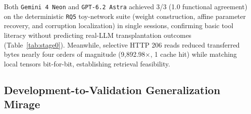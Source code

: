 \documentclass[11pt]{article}
\begin{document}
\begin{table}[htbp]
\centering
\caption{Calibration baselines, exploratory \texttt{RQ5} synthetic toy-network comparison (with disclosed aggregate-score visibility caveat before Astra's session), and HTTP 206 selective Safetensors verification.}
\label{tab:stage0}
\setlength{\tabcolsep}{5pt}
\end{table}

Both \texttt{Gemini 4 Neon} and \texttt{GPT-6.2 Astra} achieved 3/3 (1.0 functional agreement) on the deterministic \texttt{RQ5} toy-network suite (weight construction, affine parameter recovery, and corruption localization) in single sessions, confirming basic tool literacy without predicting real-LLM transplantation outcomes (Table~\ref{tab:stage0}). Meanwhile, selective HTTP 206 reads reduced transferred bytes nearly four orders of magnitude (9,892.98$\times$, 1 cache hit) while matching local tensors bit-for-bit, establishing retrieval feasibility.

\subsection{Development-to-Validation Generalization Mirage}
\end{document}
